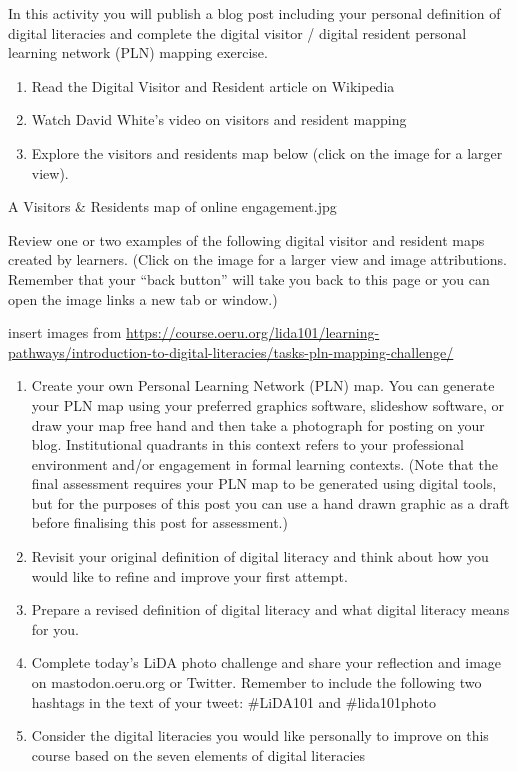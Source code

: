 \documentclass[
]{book}
\providecommand{\tightlist}{%
  \setlength{\itemsep}{0pt}\setlength{\parskip}{0pt}}
\theoremstyle{definition}
\theoremstyle{definition}
\theoremstyle{definition}
\theoremstyle{definition}
\theoremstyle{remark}
\begin{document}
\begin{reflect}
In this activity you will publish a blog post including your personal definition of digital literacies and complete the digital visitor / digital resident personal learning network (PLN) mapping exercise.

\begin{enumerate}
\def\labelenumi{\arabic{enumi}.}
\item
  Read the Digital Visitor and Resident article on Wikipedia
\item
  Watch David White's video on visitors and resident mapping
\item
  Explore the visitors and residents map below (click on the image for a larger view).
\end{enumerate}

A Visitors \& Residents map of online engagement.jpg

Review one or two examples of the following digital visitor and resident maps created by learners. (Click on the image for a larger view and image attributions. Remember that your ``back button'' will take you back to this page or you can open the image links a new tab or window.)

insert images from \url{https://course.oeru.org/lida101/learning-pathways/introduction-to-digital-literacies/tasks-pln-mapping-challenge/}

\begin{enumerate}
\def\labelenumi{\arabic{enumi}.}
\tightlist
\item
  Create your own Personal Learning Network (PLN) map. You can generate your PLN map using your preferred graphics software, slideshow software, or draw your map free hand and then take a photograph for posting on your blog. Institutional quadrants in this context refers to your professional environment and/or engagement in formal learning contexts. (Note that the final assessment requires your PLN map to be generated using digital tools, but for the purposes of this post you can use a hand drawn graphic as a draft before finalising this post for assessment.)
\item
  Revisit your original definition of digital literacy and think about how you would like to refine and improve your first attempt.
\item
  Prepare a revised definition of digital literacy and what digital literacy means for you.
\item
  Complete today's LiDA photo challenge and share your reflection and image on mastodon.oeru.org or Twitter. Remember to include the following two hashtags in the text of your tweet: \#LiDA101 and \#lida101photo
\item
  Consider the digital literacies you would like personally to improve on this course based on the seven elements of digital literacies
\end{enumerate}
\end{reflect}
\end{document}

